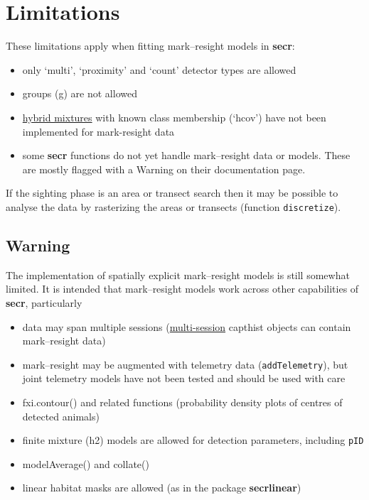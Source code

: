 \documentclass[
]{book}
\providecommand{\tightlist}{%
  \setlength{\itemsep}{0pt}\setlength{\parskip}{0pt}}
\begin{document}
\section{Limitations}\label{MRlimitations}

These limitations apply when fitting mark--resight models in \textbf{secr}:

\begin{itemize}
\tightlist
\item
  only `multi', `proximity' and `count' detector types are allowed
\item
  groups (g) are not allowed
\item
  \hyperref[hybrid-mixtures]{hybrid mixtures} with known class membership (`hcov') have not been implemented for mark-resight data
\item
  some \textbf{secr} functions do not yet handle mark--resight data or models. These are mostly flagged with a Warning on their documentation page.
\end{itemize}

If the sighting phase is an area or transect search then it may be possible to analyse the data by rasterizing the areas or transects (function \texttt{discretize}).

\subsection{Warning}\label{warning}

The implementation of spatially explicit mark--resight models is still somewhat limited. It is intended that mark--resight models work across other capabilities of \textbf{secr}, particularly

\begin{itemize}
\tightlist
\item
  data may span multiple sessions (\hyperref[Multisession]{multi-session} capthist objects can contain mark--resight data)
\item
  mark--resight may be augmented with telemetry data (\texttt{addTelemetry}), but joint telemetry models have not been tested and should be used with care
\item
  fxi.contour() and related functions (probability density plots of centres of detected animals)
\item
  finite mixture (h2) models are allowed for detection parameters, including \texttt{pID}
\item
  modelAverage() and collate()
\item
  linear habitat masks are allowed (as in the package \textbf{secrlinear})
\end{itemize}
\end{document}
